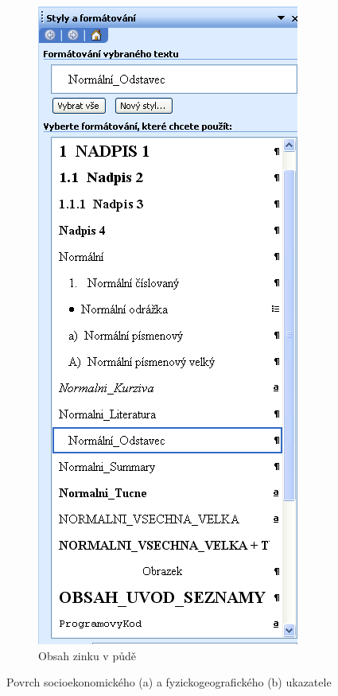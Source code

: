 \begin{figure}
\begin{subfigure}[b]{0.45\textwidth}
          \label{fig2.1}
        \end{subfigure}%
        \quad %
        \begin{subfigure}[b]{0.45\textwidth}
          \centering
          \includegraphics[width=\textwidth]{./obrazky/obrazek_1.png}
          \caption{Obsah zinku v půdě }
          \label{fig2.2}
        \end{subfigure}
        \caption{Povrch socioekonomického (a) a fyzickogeografického (b) ukazatele}
        \label{fig2}
    \end{figure}

